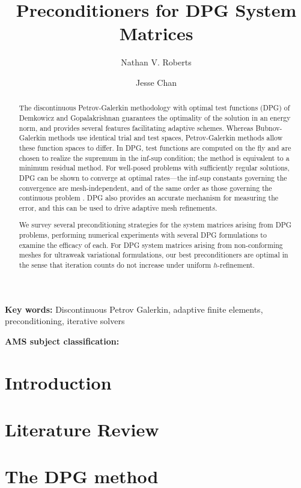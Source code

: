 \documentclass[9pt,c,3p]{elsarticle}
\title{Preconditioners for DPG System Matrices}
\author[anl]{Nathan V. Roberts}
\author[rice]{Jesse Chan}
\begin{document}
\begin{abstract}
The discontinuous Petrov-Galerkin methodology with optimal test functions (DPG) of Demkowicz and Gopalakrishnan \cite{DPG1,DPG2} guarantees the optimality of the solution in an energy norm, and provides several features facilitating adaptive schemes. Whereas Bubnov-Galerkin methods use identical trial and test spaces, Petrov-Galerkin methods allow these function spaces to differ. In DPG, test functions are computed on the fly and are chosen to realize the supremum in the inf-sup condition; the method is equivalent to a minimum residual method. For well-posed problems with sufficiently regular solutions, DPG can be shown to converge at optimal rates---the inf-sup constants governing the convergence are mesh-independent, and of the same order as those governing the continuous problem \cite{DPGStokes}. DPG also provides an accurate mechanism for measuring the error, and this can be used to drive adaptive mesh refinements.

We survey several preconditioning strategies for the system matrices arising from DPG problems, performing numerical experiments with several DPG formulations to examine the efficacy of each.  For DPG system matrices arising from non-conforming meshes for ultraweak variational formulations, our best preconditioners are optimal in the sense that iteration counts do not increase under uniform $h$-refinement.
\end{abstract}

{\bf Key words:}
Discontinuous Petrov Galerkin, adaptive finite elements, preconditioning, iterative solvers

{\bf AMS subject classification:} %

\maketitle

\section{Introduction} %


\section{Literature Review}

\section{The DPG method}
\end{document}
